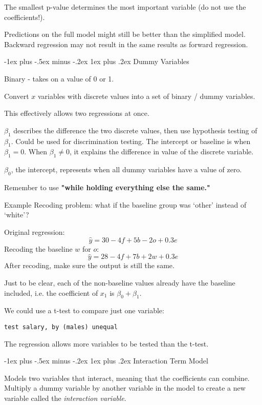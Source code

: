 \documentclass[10pt,landscape]{article}
\makeatletter
\renewcommand{\subsubsection}{\@startsection{subsubsection}{3}{0mm}%
                                {-1ex plus -.5ex minus -.2ex}%
                                {1ex plus .2ex}%
                                {\normalfont\small\bfseries}}
\makeatother
\begin{document}
\begin{multicols*}{3}
The smallest p-value determines the most important variable (do not use the coefficients!).

Predictions on the full model might still be better than the simplified model. Backward regression may not result in the same results as forward regression.

\subsubsection{Dummy Variables}

Binary - takes on a value of 0 or 1.

Convert $x$ variables with discrete values into a set of binary / dummy variables.

This effectively allows two regressions at once.

$\beta_1$ describes the difference the two discrete values, then use hypothesis testing of $\beta_1$. Could be used for discrimination testing. The intercept or baseline is when $\beta_1 = 0$. When $\beta_1 \neq 0$, it explains the difference in value of the discrete variable.

$\beta_0$, the intercept, represents when all dummy variables have a value of zero.

Remember to use \textbf{"while holding everything else the same."}

Example Recoding problem: what if the baseline group was `other' instead of `white'? 

Original regression:
\[
\hat{y} = 30 -4 f + 5 b - 2 o + 0.3 e
\]
Recoding the baseline $w$ for $o$:
\[
\hat{y} = 28 -4 f + 7 b + 2 w + 0.3 e
\]
After recoding, make sure the output is still the same.

Just to be clear, each of the non-baseline values already have the baseline included, i.e. the coefficient of $x_1$ is $\beta_0 + \beta_1$.

We could use a t-test to compare just one variable:
\begin{verbatim}
test salary, by (males) unequal
\end{verbatim}

The regression allows more variables to be tested than the t-test.

\subsubsection{Interaction Term Model}

Models two variables that interact, meaning that the coefficients can combine. Multiply a dummy variable by another variable in the model to create a new variable called the \textit{interaction variable}.


\end{multicols*}
\end{document}
